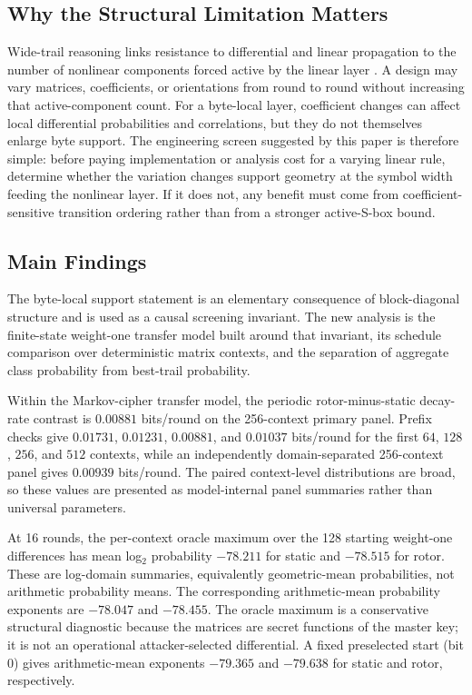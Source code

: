 \documentclass[cryptography,article,submit,oneauthor]{Definitions/mdpi}
\begin{document}
\subsection{Why the Structural Limitation Matters}\label{sec:1-significance}
Wide-trail reasoning links resistance to differential and linear propagation to the number of nonlinear components forced active by the linear layer \cite{ref21,ref5}. A design may vary matrices, coefficients, or orientations from round to round without increasing that active-component count. For a byte-local layer, coefficient changes can affect local differential probabilities and correlations, but they do not themselves enlarge byte support. The engineering screen suggested by this paper is therefore simple: before paying implementation or analysis cost for a varying linear rule, determine whether the variation changes support geometry at the symbol width feeding the nonlinear layer. If it does not, any benefit must come from coefficient-sensitive transition ordering rather than from a stronger active-S-box bound.

\subsection{Main Findings}\label{sec:1-2}
The byte-local support statement is an elementary consequence of block-diagonal structure and is used as a causal screening invariant. The new analysis is the finite-state weight-one transfer model built around that invariant, its schedule comparison over deterministic matrix contexts, and the separation of aggregate class probability from best-trail probability.

Within the Markov-cipher transfer model, the periodic rotor-minus-static decay-rate contrast is $0.00881$ bits/round on the 256-context primary panel. Prefix checks give $0.01731$, $0.01231$, $0.00881$, and $0.01037$ bits/round for the first $64$, $128$, $256$, and $512$ contexts, while an independently domain-separated 256-context panel gives $0.00939$ bits/round. The paired context-level distributions are broad, so these values are presented as model-internal panel summaries rather than universal parameters.

At 16 rounds, the per-context oracle maximum over the 128 starting weight-one differences has mean log$_2$ probability $-78.211$ for static and $-78.515$ for rotor. These are log-domain summaries, equivalently geometric-mean probabilities, not arithmetic probability means. The corresponding arithmetic-mean probability exponents are $-78.047$ and $-78.455$. The oracle maximum is a conservative structural diagnostic because the matrices are secret functions of the master key; it is not an operational attacker-selected differential. A fixed preselected start (bit 0) gives arithmetic-mean exponents $-79.365$ and $-79.638$ for static and rotor, respectively.
\end{document}
